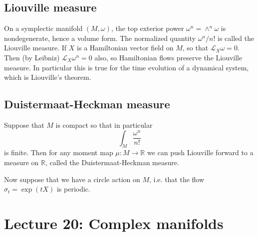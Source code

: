 \documentclass[11pt]{article} %
\begin{document}
\subsection*{Liouville measure}
On a symplectic manifold $(M, \omega)$, the top exterior power $\omega^n = \wedge^n \omega$ is nondegenerate, hence a volume form. The normalized quantity $\omega^n/n!$ is called the Liouville measure. If $X$ is a Hamiltonian vector field on $M$, so that $\mathscr{L}_X \omega = 0$. Then (by Leibniz) $\mathscr{L}_X \omega^n = 0$ also, so Hamiltonian flows preserve the Liouville measure. In particular this is true for the time evolution of a dynamical system, which is Liouville's theorem. 
\subsection*{Duistermaat-Heckman measure}
Suppose that $M$ is compact so that in particular 
$$
\int_M \frac{\omega^n}{n!} 
$$
is finite. Then for any moment map $\mu:M \rightarrow \mathbb{R}$ we can push Liouville forward to a measure on $\mathbb{R}$, called the Duistermaat-Heckman measure. 

Now suppose that we have a circle action on $M$, i.e. that the flow $\sigma_t = \operatorname{exp}(tX)$ is periodic. 


\section*{Lecture 20: Complex manifolds}
\end{document}
